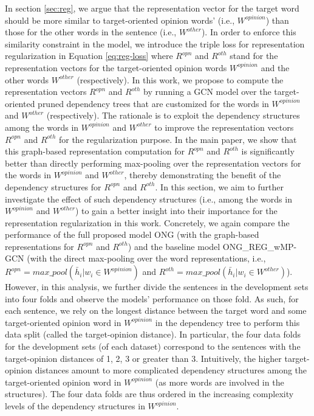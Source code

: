 \documentclass[11pt,a4paper]{article}
\begin{document}
In section \ref{sec:reg}, we argue that the representation vector for the target word should be more similar to target-oriented opinion words' (i.e., $W^{opinion}$) than those for the other words in the sentence (i.e., $W^{other}$). In order to enforce this similarity constraint in the model, we introduce the triple loss for representation regularization in Equation \ref{eq:reg-loss} where $R^{opn}$ and $R^{oth}$ stand for the representation vectors for the target-oriented opinion words $W^{opinion}$ and the other words $W^{other}$ (respectively). In this work, we propose to compute the representation vectors $R^{opn}$ and $R^{oth}$ by running a GCN model over the target-oriented pruned dependency trees that are customized for the words in $W^{opinion}$ and $W^{other}$ (respectively). The rationale is to exploit the dependency structures among the words in $W^{opinion}$ and $W^{other}$ to improve the representation vectors $R^{opn}$ and $R^{oth}$ for the regularization purpose. In the main paper, we show that this graph-based representation computation for $R^{opn}$ and $R^{oth}$ is significantly better than directly performing max-pooling over the representation vectors for the words in $W^{opinion}$ and $W^{other}$, thereby demonstrating the benefit of the dependency structures for $R^{opn}$ and $R^{oth}$. In this section, we aim to further investigate the effect of such dependency structures (i.e., among the words in $W^{opinion}$ and $W^{other}$) to gain a better insight into their importance for the representation regularization in this work. Concretely, we again compare the performance of the full proposed model ONG (with the graph-based representations for $R^{opn}$ and $R^{oth}$) and the baseline model ONG\_REG\_wMP-GCN (with the direct max-pooling over the word representations, i.e., $R^{opn} = max\_pool(\bar{h}_i|w_i \in W^{opinion})$ and $R^{oth} = max\_pool(\bar{h}_i|w_i \in W^{other})$). However, in this analysis, we further divide the sentences in the development sets into four folds and observe the models' performance on those fold. As such, for each sentence, we rely on the longest distance between the target word and some target-oriented opinion word in $W^{opinion}$ in the dependency tree to perform this data split (called the target-opinion distance). In particular, the four data folds for the development sets (of each dataset) correspond to the sentences with the target-opinion distances of 1, 2, 3 or greater than 3. Intuitively, the higher target-opinion distances amount to more complicated dependency structures among the target-oriented opinion word in $W^{opinion}$ (as more words are involved in the structures). The four data folds are thus ordered in the increasing complexity levels of the dependency structures in $W^{opinion}$.
\end{document}
